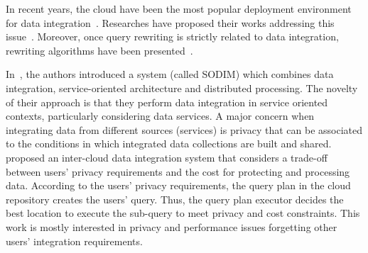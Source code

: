 In recent years, the cloud have been the most popular deployment environment for data integration~\cite{Carvalho2015}. Researches have proposed their works addressing this issue~\cite{ElSheikh2013,Tian2010}.
Moreover, once query rewriting is strictly related to data integration, rewriting algorithms have been presented~\cite{ba2014,Barhamgi2010,Benouaret2011}.

In~\cite{ElSheikh2013}, the authors introduced a system (called SODIM) which combines data
integration, service-oriented architecture and distributed processing.
The novelty of their approach is that they perform data integration 
in service oriented contexts, particularly considering data services. 
%
A major concern when integrating data from different sources (services) is privacy that can be associated to the conditions in which integrated data collections are built and shared.
\cite{Tian2010} proposed an inter-cloud data integration system that considers a trade-off between users' privacy requirements and the cost for protecting and processing data. According to the users' privacy requirements, the query plan in the cloud repository creates the users' query. 
Thus, the query plan executor decides the best location to execute the sub-query to meet privacy and cost constraints.
This work is mostly interested in privacy and performance issues forgetting other users' integration requirements.

